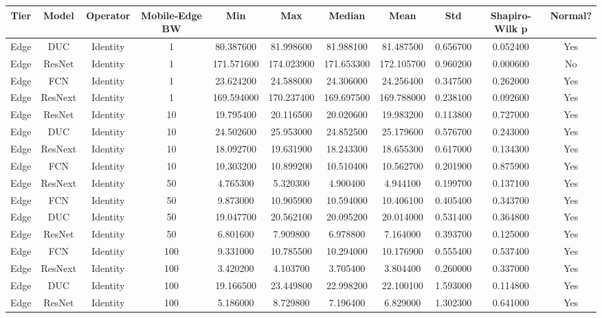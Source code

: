\begin{tabular}{|c||c||c||c||c||c||c||c||c||c||c|}
\toprule
Tier & Model & Operator & Mobile-Edge BW & Min & Max & Median & Mean & Std & Shapiro-Wilk p & Normal? \\
\midrule
Edge & DUC & Identity & 1 & 80.387600 & 81.998600 & 81.988100 & 81.487500 & 0.656700 & 0.052400 & Yes \\
Edge & ResNet & Identity & 1 & 171.571600 & 174.023900 & 171.653300 & 172.105700 & 0.960200 & 0.000600 & No \\
Edge & FCN & Identity & 1 & 23.624200 & 24.588000 & 24.306000 & 24.256400 & 0.347500 & 0.262000 & Yes \\
Edge & ResNext & Identity & 1 & 169.594000 & 170.237400 & 169.697500 & 169.788000 & 0.238100 & 0.092600 & Yes \\
Edge & ResNet & Identity & 10 & 19.795400 & 20.116500 & 20.020600 & 19.983200 & 0.113800 & 0.727000 & Yes \\
Edge & DUC & Identity & 10 & 24.502600 & 25.953000 & 24.852500 & 25.179600 & 0.576700 & 0.243000 & Yes \\
Edge & ResNext & Identity & 10 & 18.092700 & 19.631900 & 18.243300 & 18.655300 & 0.617000 & 0.134300 & Yes \\
Edge & FCN & Identity & 10 & 10.303200 & 10.899200 & 10.510400 & 10.562700 & 0.201900 & 0.875900 & Yes \\
Edge & ResNext & Identity & 50 & 4.765300 & 5.320300 & 4.900400 & 4.944100 & 0.199700 & 0.137100 & Yes \\
Edge & FCN & Identity & 50 & 9.873000 & 10.905900 & 10.594000 & 10.406100 & 0.405400 & 0.343700 & Yes \\
Edge & DUC & Identity & 50 & 19.047700 & 20.562100 & 20.095200 & 20.014000 & 0.531400 & 0.364800 & Yes \\
Edge & ResNet & Identity & 50 & 6.801600 & 7.909800 & 6.978800 & 7.164000 & 0.393700 & 0.125000 & Yes \\
Edge & FCN & Identity & 100 & 9.331000 & 10.785500 & 10.294000 & 10.176900 & 0.555400 & 0.537400 & Yes \\
Edge & ResNext & Identity & 100 & 3.420200 & 4.103700 & 3.705400 & 3.804400 & 0.260000 & 0.337000 & Yes \\
Edge & DUC & Identity & 100 & 19.166500 & 23.449800 & 22.998200 & 22.100100 & 1.593000 & 0.114800 & Yes \\
Edge & ResNet & Identity & 100 & 5.186000 & 8.729800 & 7.196400 & 6.829000 & 1.302300 & 0.641000 & Yes \\

\end{tabular}
